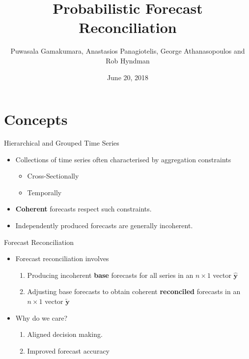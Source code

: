 \documentclass{beamer}
\title{Probabilistic Forecast Reconciliation}
\date{June 20, 2018}
\author[GPAH]{Puwasala Gamakumara, Anastasios Panagiotelis, George Athanasopoulos and Rob Hyndman}
\begin{document}
  \begin{frame}
    \maketitle
  \end{frame}
  \section{Concepts}
  \begin{frame}{Hierarchical and Grouped Time Series}
  	\begin{itemize}
  	  \item Collections of time series often characterised by aggregation constraints
  	  \begin{itemize}
  	    \item Cross-Sectionally
  		\item Temporally
  	  \end{itemize}
      \item {\bf Coherent} forecasts respect such constraints. 
      \item Independently produced forecasts are generally incoherent.
  \end{itemize}
\begin{figure}
	\begin{center}
		  
		 
		\qobitree
	\end{center}
\end{figure}
\end{frame}  
  \begin{frame}{Forecast Reconciliation}
  	\begin{itemize}
  	  \item Forecast reconciliation involves
  	  \begin{enumerate}
  	  	\item Producing incoherent {\bf base} forecasts for all series in an $n\times 1$ vector $\hat{\bm y}$
        \item Adjusting base forecasts to obtain coherent {\bf reconciled} forecasts in an $n\times 1$ vector $\tilde{\bm y}$
  	  \end{enumerate} 
      \item Why do we care?
        \begin{enumerate}
        	\item Aligned decision making.
        	\item Improved forecast accuracy
        \end{enumerate}
  	\end{itemize}
  \end{frame}
\end{document}
